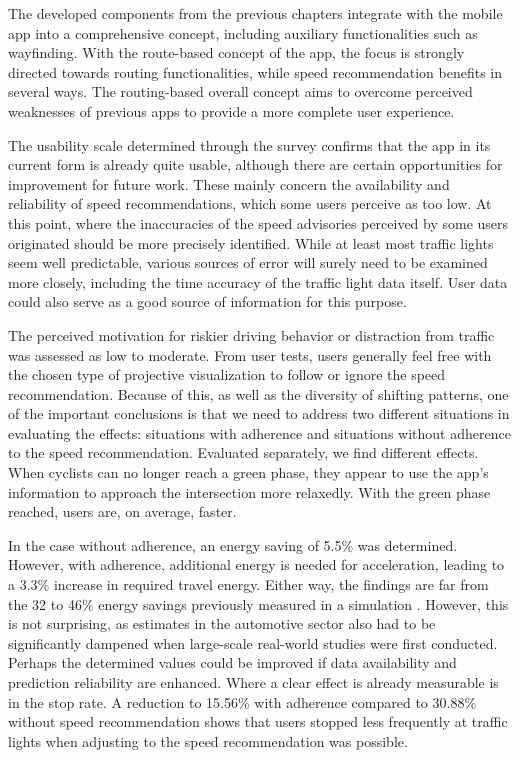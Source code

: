 The developed components from the previous chapters integrate with the mobile app into a comprehensive concept, including auxiliary functionalities such as wayfinding. With the route-based concept of the app, the focus is strongly directed towards routing functionalities, while speed recommendation benefits in several ways. The routing-based overall concept aims to overcome perceived weaknesses of previous apps to provide a more complete user experience.

The usability scale determined through the survey confirms that the app in its current form is already quite usable, although there are certain opportunities for improvement for future work. These mainly concern the availability and reliability of speed recommendations, which some users perceive as too low. At this point, where the inaccuracies of the speed advisories perceived by some users originated should be more precisely identified. While at least most traffic lights seem well predictable, various sources of error will surely need to be examined more closely, including the time accuracy of the traffic light data itself. User data could also serve as a good source of information for this purpose.

The perceived motivation for riskier driving behavior or distraction from traffic was assessed as low to moderate. From user tests, users generally feel free with the chosen type of projective visualization to follow or ignore the speed recommendation. Because of this, as well as the diversity of shifting patterns, one of the important conclusions is that we need to address two different situations in evaluating the effects: situations with adherence and situations without adherence to the speed recommendation. Evaluated separately, we find different effects. When cyclists can no longer reach a green phase, they appear to use the app's information to approach the intersection more relaxedly. With the green phase reached, users are, on average, faster.

In the case without adherence, an energy saving of 5.5\% was determined. However, with adherence, additional energy is needed for acceleration, leading to a 3.3\% increase in required travel energy. Either way, the findings are far from the 32 to 46\% energy savings previously measured in a simulation \cite{tal_vehicular-communications-based_2016}. However, this is not surprising, as estimates in the automotive sector also had to be significantly dampened when large-scale real-world studies were first conducted. Perhaps the determined values could be improved if data availability and prediction reliability are enhanced. Where a clear effect is already measurable is in the stop rate. A reduction to 15.56\% with adherence compared to 30.88\% without speed recommendation shows that users stopped less frequently at traffic lights when adjusting to the speed recommendation was possible.
